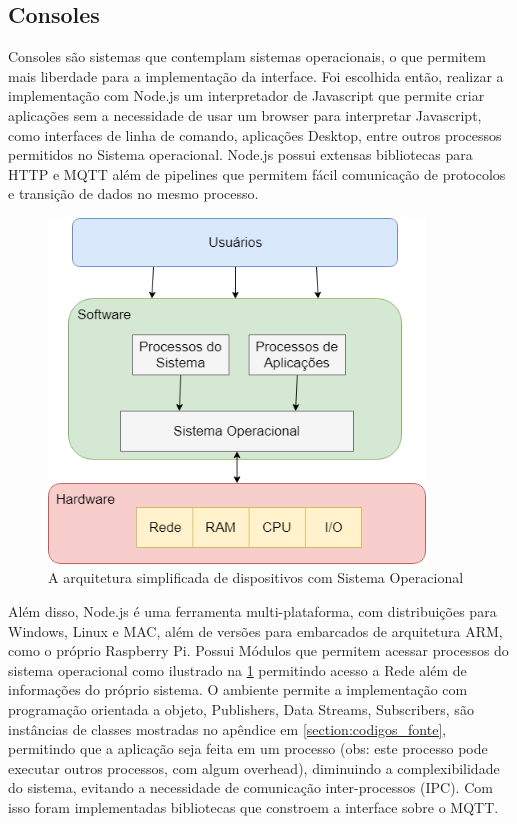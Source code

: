 \subsection{Consoles}
\label{subsubsection:consoles}

Consoles são sistemas que contemplam sistemas operacionais, o que permitem mais liberdade para a implementação da interface. Foi escolhida então, realizar a implementação com Node.js um interpretador de Javascript que permite criar aplicações sem a necessidade de usar um browser para interpretar Javascript, como interfaces de linha de comando, aplicações Desktop, entre outros processos permitidos no Sistema operacional. Node.js possui extensas bibliotecas para HTTP e MQTT além de pipelines que permitem fácil comunicação de protocolos e transição de dados no mesmo processo.


\begin{figure}[h!]
\centering
\includegraphics[width=10cm]{./02_Capitulos/02_Cap3/figures/os-diagram}
\caption{A arquitetura simplificada de dispositivos com Sistema Operacional}
\label{fig:3.3.4/os-diagram}
\end{figure}


Além disso, Node.js é uma ferramenta multi-plataforma, com distribuições para Windows, Linux e MAC, além de versões para embarcados de arquitetura ARM, como o próprio Raspberry Pi. Possui Módulos que permitem acessar processos do sistema operacional como ilustrado na \ref{fig:3.3.4/os-diagram} permitindo acesso a Rede além de informações do próprio sistema. O ambiente permite a implementação com programação orientada a objeto, Publishers, Data Streams, Subscribers, são instâncias de classes mostradas no apêndice em \ref{section:codigos_fonte}, permitindo que a aplicação seja feita em um processo (obs: este processo pode executar outros processos, com algum overhead), diminuindo a complexibilidade do sistema, evitando a necessidade de comunicação inter-processos (IPC).  Com isso foram implementadas bibliotecas que constroem a interface sobre o MQTT.

